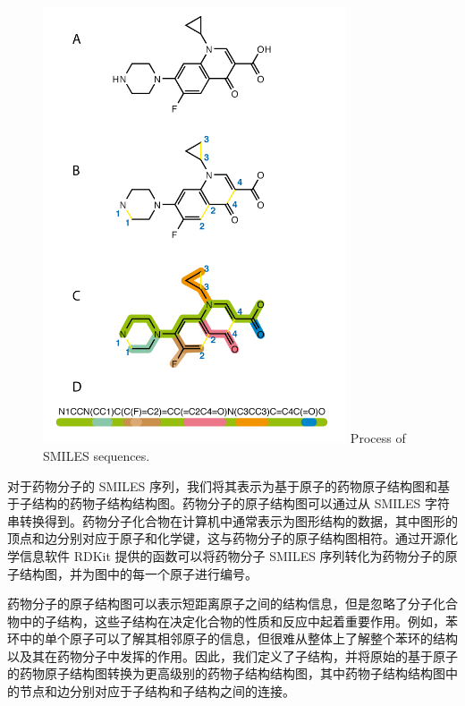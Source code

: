 \begin{figure}[!htbp] 
\centering
\includegraphics[width=0.8\textwidth]  {imgs/SMILES.png}
{Process of SMILES sequences.}
\label{fig:SMILES}
\end{figure}

对于药物分子的 SMILES 序列，我们将其表示为基于原子的药物原子结构图和基于子结构的药物子结构结构图。药物分子的原子结构图可以通过从 SMILES 字符串转换得到。药物分子化合物在计算机中通常表示为图形结构的数据，其中图形的顶点和边分别对应于原子和化学键，这与药物分子的原子结构图相符。通过开源化学信息软件 RDKit 提供的函数可以将药物分子 SMILES 序列转化为药物分子的原子结构图，并为图中的每一个原子进行编号。

药物分子的原子结构图可以表示短距离原子之间的结构信息，但是忽略了分子化合物中的子结构，这些子结构在决定化合物的性质和反应中起着重要作用。例如，苯环中的单个原子可以了解其相邻原子的信息，但很难从整体上了解整个苯环的结构以及其在药物分子中发挥的作用。因此，我们定义了子结构，并将原始的基于原子的药物原子结构图转换为更高级别的药物子结构结构图，其中药物子结构结构图中的节点和边分别对应于子结构和子结构之间的连接。


